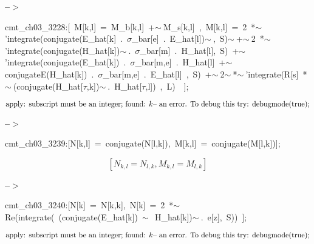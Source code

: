\documentclass[fleqn]{article}
\begin{document}
\noindent
\begin{minipage}[t]{4.000000em}\color{red}\bfseries
 --\ensuremath{\ensuremath{>}}	
\end{minipage}
\begin{minipage}[t]{\textwidth}\color{blue}
cmt\_ch03\_3228:[\ M[k,l]\ =\ M\_b[k,l]\ +\ensuremath{\sim\ }M\_s[k,l]\ ,\ M[k,l]\ =\ 2\ *\ensuremath{\sim\ }'integrate(conjugate(E\_hat[k]\ .\ \ensuremath{\sigma}\_bar[e]\ .\ E\_hat[l])\ensuremath{\sim\ },\ S)\ensuremath{\sim\ }+\ensuremath{\sim\ }2\ *\ensuremath{\sim\ }'integrate(conjugate(H\_hat[k])\ensuremath{\sim\ }.\ \ensuremath{\sigma}\_bar[m]\ .\ H\_hat[l],\ S)\ +\ensuremath{\sim\ }'integrate(conjugate(E\_hat[k])\ .\ \ensuremath{\sigma}\_bar[m,e]\ .\ H\_hat[l]\ +\ensuremath{\sim\ }conjugateE(H\_hat[k])\ .\ \ensuremath{\sigma}\_bar[m,e]\ .\ E\_hat[l]\ ,\ S)\ +\ensuremath{\sim\ }2\ensuremath{\sim\ }*\ensuremath{\sim\ }'integrate(R[s]\ *\ensuremath{\sim\ }(conjugate(H\_hat[\ensuremath{\tau},k])\ensuremath{\sim\ }.\ H\_hat[\ensuremath{\tau},l])\ ,\ L)\ \ ];
\end{minipage}
\[\displaystyle \mbox{}\\\mbox{%
apply: subscript must be an integer; found: }k
\mbox{%
 -- an error. To debug this try: debugmode(true);}\mbox{}
\]


\noindent
\begin{minipage}[t]{4.000000em}\color{red}\bfseries
 --\ensuremath{\ensuremath{>}}	
\end{minipage}
\begin{minipage}[t]{\textwidth}\color{blue}
cmt\_ch03\_3239:[N[k,l]\ =\ conjugate(N[l,k]),\ M[k,l]\ =\ conjugate(M[l,k])];
\end{minipage}
\[\displaystyle \tag{cmt\_ ch03\_ 3239} 
\left[ {N_{k,l}}={N_{l,k}}\operatorname{,}{M_{k,l}}={M_{l,k}}\right] \mbox{}
\]


\noindent
\begin{minipage}[t]{4.000000em}\color{red}\bfseries
 --\ensuremath{\ensuremath{>}}	
\end{minipage}
\begin{minipage}[t]{\textwidth}\color{blue}
cmt\_ch03\_3240:[N[k]\ =\ N[k,k],\ N[k]\ =\ 2\ *\ensuremath{\sim\ }Re(integrate(\ (conjugate(E\_hat[k])\ \ensuremath{\sim\ }\ H\_hat[k])\ensuremath{\sim\ }.\ e[z],\ S))\ ];
\end{minipage}
\[\displaystyle \mbox{}\\\mbox{%
apply: subscript must be an integer; found: }k
\mbox{%
 -- an error. To debug this try: debugmode(true);}\mbox{}
\]
\end{document}
